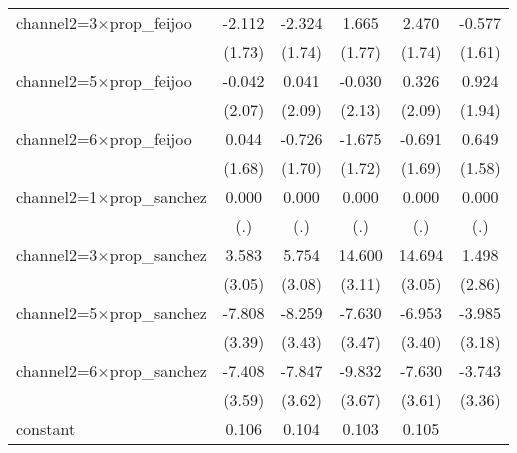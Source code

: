 \begin{table}[htbp]
\begin{tabular}{l*{5}{c}}
channel2=3$\times$prop\_feijoo&      -2.112         &      -2.324         &       1.665         &       2.470         &      -0.577         \\
                    &      (1.73)         &      (1.74)         &      (1.77)         &      (1.74)         &      (1.61)         \\
channel2=5$\times$prop\_feijoo&      -0.042         &       0.041         &      -0.030         &       0.326         &       0.924         \\
                    &      (2.07)         &      (2.09)         &      (2.13)         &      (2.09)         &      (1.94)         \\
channel2=6$\times$prop\_feijoo&       0.044         &      -0.726         &      -1.675         &      -0.691         &       0.649         \\
                    &      (1.68)         &      (1.70)         &      (1.72)         &      (1.69)         &      (1.58)         \\
channel2=1$\times$prop\_sanchez&       0.000         &       0.000         &       0.000         &       0.000         &       0.000         \\
                    &         (.)         &         (.)         &         (.)         &         (.)         &         (.)         \\
channel2=3$\times$prop\_sanchez&       3.583         &       5.754         &      14.600\sym{***}&      14.694\sym{***}&       1.498         \\
                    &      (3.05)         &      (3.08)         &      (3.11)         &      (3.05)         &      (2.86)         \\
channel2=5$\times$prop\_sanchez&      -7.808\sym{*}  &      -8.259\sym{*}  &      -7.630\sym{*}  &      -6.953\sym{*}  &      -3.985         \\
                    &      (3.39)         &      (3.43)         &      (3.47)         &      (3.40)         &      (3.18)         \\
channel2=6$\times$prop\_sanchez&      -7.408\sym{*}  &      -7.847\sym{*}  &      -9.832\sym{**} &      -7.630\sym{*}  &      -3.743         \\
                    &      (3.59)         &      (3.62)         &      (3.67)         &      (3.61)         &      (3.36)         \\
constant            &       0.106\sym{***}&       0.104\sym{***}&       0.103\sym{***}&       0.105\sym{***}&                     \\

\end{tabular}
\end{table}
